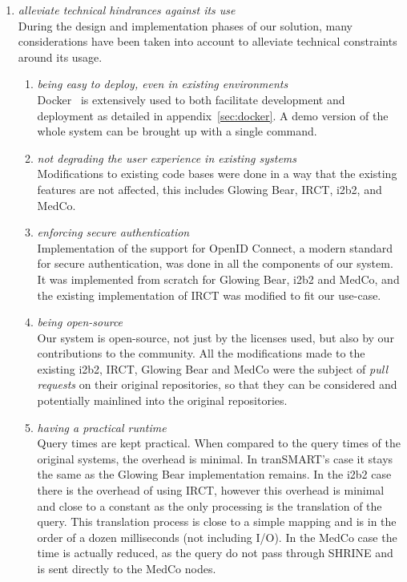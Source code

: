 \begin{enumerate}
    \item \emph{alleviate technical hindrances against its use} \\
    During the design and implementation phases of our solution, many considerations have been taken into account to alleviate technical constraints around its usage.
    \begin{enumerate}
        \item \emph{being easy to deploy, even in existing environments} \\
        Docker~\cite{merkel2014docker} is extensively used to both facilitate development and deployment as detailed in appendix~\ref{sec:docker}.
        A demo version of the whole system can be brought up with a single command.
        
        \item \emph{not degrading the user experience in existing systems} \\
        Modifications to existing code bases were done in a way that the existing features are not affected, this includes Glowing Bear, IRCT, i2b2, and MedCo.
        
        \item \emph{enforcing secure authentication} \\
        Implementation of the support for OpenID Connect, a modern standard for secure authentication, was done in all the components of our system.
        It was implemented from scratch for Glowing Bear, i2b2 and MedCo, and the existing implementation of IRCT was modified to fit our use-case.
        
        \item \emph{being open-source} \\
        Our system is open-source, not just by the licenses used, but also by our contributions to the community.
        All the modifications made to the existing i2b2, IRCT, Glowing Bear and MedCo were the subject of \emph{pull requests} on their original repositories, so that they can be considered and potentially mainlined into the original repositories.
        
        \item \emph{having a practical runtime} \\
        Query times are kept practical.
        When compared to the query times of the original systems, the overhead is minimal.
        In tranSMART's case it stays the same as the Glowing Bear implementation remains.
        In the i2b2 case there is the overhead of using IRCT, however this overhead is minimal and close to a constant as the only processing is the translation of the query. 
        This translation process is close to a simple mapping and is in the order of a dozen milliseconds (not including I/O).
        In the MedCo case the time is actually reduced, as the query do not pass through SHRINE and is sent directly to the MedCo nodes.
        
        
    \end{enumerate}
\end{enumerate}


